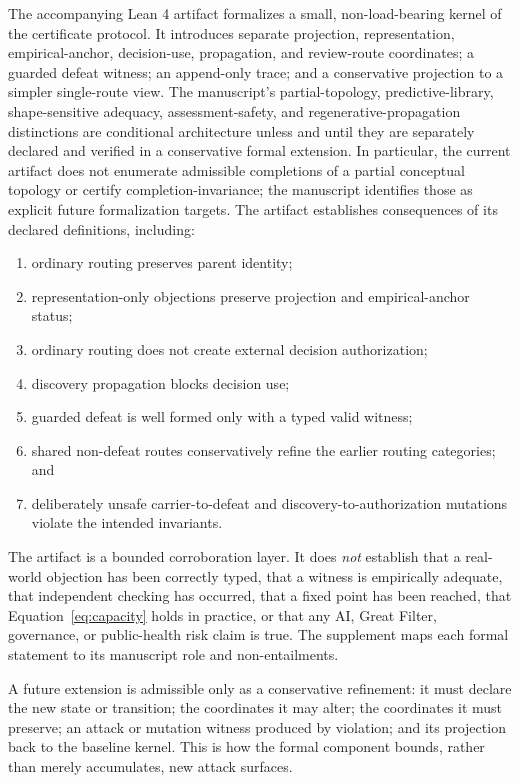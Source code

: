\documentclass[11pt]{article}
\begin{document}
\label{sec:lean}

The accompanying Lean 4 artifact formalizes a small, non-load-bearing kernel of the certificate protocol. It introduces separate projection, representation, empirical-anchor, decision-use, propagation, and review-route coordinates; a guarded defeat witness; an append-only trace; and a conservative projection to a simpler single-route view. The manuscript's partial-topology, predictive-library, shape-sensitive adequacy, assessment-safety, and regenerative-propagation distinctions are conditional architecture unless and until they are separately declared and verified in a conservative formal extension. In particular, the current artifact does not enumerate admissible completions of a partial conceptual topology or certify completion-invariance; the manuscript identifies those as explicit future formalization targets. The artifact establishes consequences of its declared definitions, including:
\begin{enumerate}[label=(\alph*)]
\item ordinary routing preserves parent identity;
\item representation-only objections preserve projection and empirical-anchor status;
\item ordinary routing does not create external decision authorization;
\item discovery propagation blocks decision use;
\item guarded defeat is well formed only with a typed valid witness;
\item shared non-defeat routes conservatively refine the earlier routing categories; and
\item deliberately unsafe carrier-to-defeat and discovery-to-authorization mutations violate the intended invariants.
\end{enumerate}

The artifact is a bounded corroboration layer. It does \emph{not} establish that a real-world objection has been correctly typed, that a witness is empirically adequate, that independent checking has occurred, that a fixed point has been reached, that Equation~\eqref{eq:capacity} holds in practice, or that any AI, Great Filter, governance, or public-health risk claim is true. The supplement maps each formal statement to its manuscript role and non-entailments.

A future extension is admissible only as a conservative refinement: it must declare the new state or transition; the coordinates it may alter; the coordinates it must preserve; an attack or mutation witness produced by violation; and its projection back to the baseline kernel. This is how the formal component bounds, rather than merely accumulates, new attack surfaces.
\end{document}
